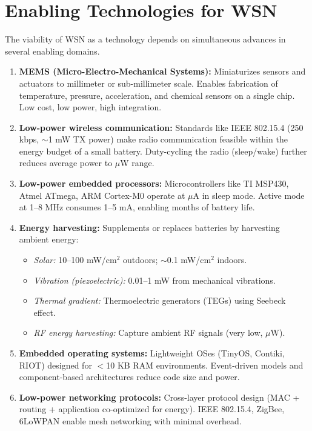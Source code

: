 \documentclass[12pt,a4paper]{article}
\begin{document}
\section{Enabling Technologies for WSN}

The viability of WSN as a technology depends on simultaneous advances in several enabling domains.

\begin{tcolorbox}[formulabox, title={\textbf{Enabling Technologies for WSN}}]
\begin{enumerate}[leftmargin=*, itemsep=5pt]
  \item \textbf{MEMS (Micro-Electro-Mechanical Systems):} Miniaturizes sensors and actuators to millimeter or sub-millimeter scale. Enables fabrication of temperature, pressure, acceleration, and chemical sensors on a single chip. Low cost, low power, high integration.

  \item \textbf{Low-power wireless communication:} Standards like IEEE 802.15.4 (250 kbps, $\sim$1 mW TX power) make radio communication feasible within the energy budget of a small battery. Duty-cycling the radio (sleep/wake) further reduces average power to $\mu$W range.

  \item \textbf{Low-power embedded processors:} Microcontrollers like TI MSP430, Atmel ATmega, ARM Cortex-M0 operate at $\mu$A in sleep mode. Active mode at 1--8 MHz consumes 1--5 mA, enabling months of battery life.

  \item \textbf{Energy harvesting:} Supplements or replaces batteries by harvesting ambient energy:
  \begin{itemize}[itemsep=2pt]
    \item \textit{Solar:} 10--100 mW/cm$^2$ outdoors; $\sim$0.1 mW/cm$^2$ indoors.
    \item \textit{Vibration (piezoelectric):} 0.01--1 mW from mechanical vibrations.
    \item \textit{Thermal gradient:} Thermoelectric generators (TEGs) using Seebeck effect.
    \item \textit{RF energy harvesting:} Capture ambient RF signals (very low, $\mu$W).
  \end{itemize}

  \item \textbf{Embedded operating systems:} Lightweight OSes (TinyOS, Contiki, RIOT) designed for $<$10 KB RAM environments. Event-driven models and component-based architectures reduce code size and power.

  \item \textbf{Low-power networking protocols:} Cross-layer protocol design (MAC + routing + application co-optimized for energy). IEEE 802.15.4, ZigBee, 6LoWPAN enable mesh networking with minimal overhead.
\end{enumerate}
\end{tcolorbox}
\end{document}
